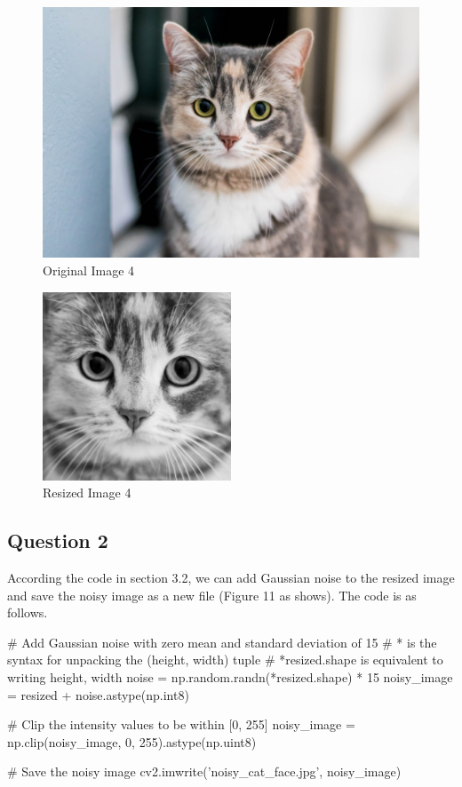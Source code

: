 \documentclass[12pt]{article}
\begin{document}
    \begin{figure}[H]
      \centering
      \includegraphics[width=1.0\textwidth]{image4.jpg}
      \caption{Original Image 4}
      \label{fig:example}
    \end{figure}

    \begin{figure}[H]
      \centering
      \includegraphics[width=0.5\textwidth]{cropped_cat_face.jpg}
      \caption{Resized Image 4}
      \label{fig:example}
    \end{figure}

\subsection{Question 2}
\quad According the code in section 3.2, we can add Gaussian noise to the resized image and save the noisy image as a new file (Figure 11 as shows). The code is as follows.
\begin{python}
# Add Gaussian noise with zero mean and standard deviation of 15
# * is the syntax for unpacking the (height, width) tuple
# *resized.shape is equivalent to writing height, width 
noise = np.random.randn(*resized.shape) * 15
noisy_image = resized + noise.astype(np.int8)
    
# Clip the intensity values to be within [0, 255]
noisy_image = np.clip(noisy_image, 0, 255).astype(np.uint8)
         
# Save the noisy image
cv2.imwrite('noisy_cat_face.jpg', noisy_image)

\end{python}
\end{document}
